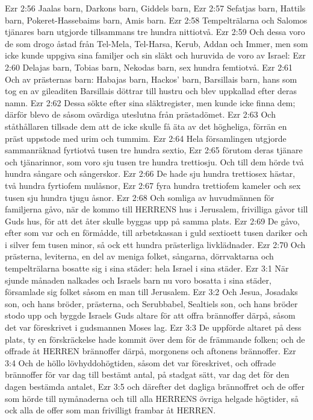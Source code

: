 Ezr 2:56  Jaalas barn, Darkons barn, Giddels barn,
Ezr 2:57  Sefatjas barn, Hattils barn, Pokeret-Hassebaims barn, Amis barn.
Ezr 2:58  Tempelträlarna och Salomos tjänares barn utgjorde tillsammans tre hundra nittiotvå.
Ezr 2:59  Och dessa voro de som drogo åstad från Tel-Mela, Tel-Harsa, Kerub, Addan och Immer, men som icke kunde uppgiva sina familjer och sin släkt och huruvida de voro av Israel:
Ezr 2:60  Delajas barn, Tobias barn, Nekodas barn, sex hundra femtiotvå.
Ezr 2:61  Och av prästernas barn: Habajas barn, Hackos' barn, Barsillais barn, hans som tog en av gileaditen Barsillais döttrar till hustru och blev uppkallad efter deras namn.
Ezr 2:62  Dessa sökte efter sina släktregister, men kunde icke finna dem; därför blevo de såsom ovärdiga uteslutna från prästadömet.
Ezr 2:63  Och ståthållaren tillsade dem att de icke skulle få äta av det högheliga, förrän en präst uppstode med urim och tummim.
Ezr 2:64  Hela församlingen utgjorde sammanräknad fyrtiotvå tusen tre hundra sextio,
Ezr 2:65  förutom deras tjänare och tjänarinnor, som voro sju tusen tre hundra trettiosju. Och till dem hörde två hundra sångare och sångerskor.
Ezr 2:66  De hade sju hundra trettiosex hästar, två hundra fyrtiofem mulåsnor,
Ezr 2:67  fyra hundra trettiofem kameler och sex tusen sju hundra tjugu åsnor.
Ezr 2:68  Och somliga av huvudmännen för familjerna gåvo, när de kommo till HERRENS hus i Jerusalem, frivilliga gåvor till Guds hus, för att det åter skulle byggas upp på samma plats.
Ezr 2:69  De gåvo, efter som var och en förmådde, till arbetskassan i guld sextioett tusen dariker och i silver fem tusen minor, så ock ett hundra prästerliga livklädnader.
Ezr 2:70  Och prästerna, leviterna, en del av meniga folket, sångarna, dörrvaktarna och tempelträlarna bosatte sig i sina städer: hela Israel i sina städer.
Ezr 3:1  När sjunde månaden nalkades och Israels barn nu voro bosatta i sina städer, församlade sig folket såsom en man till Jerusalem.
Ezr 3:2  Och Jesua, Josadaks son, och hans bröder, prästerna, och Serubbabel, Sealtiels son, och hans bröder stodo upp och byggde Israels Guds altare för att offra brännoffer därpå, såsom det var föreskrivet i gudsmannen Moses lag.
Ezr 3:3  De uppförde altaret på dess plats, ty en förskräckelse hade kommit över dem för de främmande folken; och de offrade åt HERREN brännoffer därpå, morgonens och aftonens brännoffer.
Ezr 3:4  Och de höllo lövhyddohögtiden, såsom det var föreskrivet, och offrade brännoffer för var dag till bestämt antal, på stadgat sätt, var dag det för den dagen bestämda antalet,
Ezr 3:5  och därefter det dagliga brännoffret och de offer som hörde till nymånaderna och till alla HERRENS övriga helgade högtider, så ock alla de offer som man frivilligt frambar åt HERREN.
